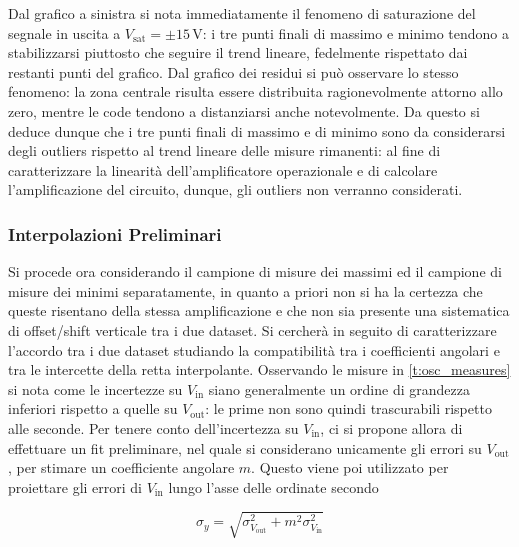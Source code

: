 \documentclass[a4paper,11pt]{article} %
\begin{document}
\noindent Dal grafico a sinistra si nota immediatamente il fenomeno di saturazione del segnale in uscita a
$V_{\text{sat}}=\pm15\,\si{\volt}$: i tre punti finali di massimo e minimo tendono a stabilizzarsi piuttosto che seguire
il trend lineare, fedelmente rispettato dai restanti punti del grafico. Dal grafico dei residui si può osservare lo
stesso fenomeno: la zona centrale risulta essere distribuita ragionevolmente attorno allo zero, mentre le code tendono a
distanziarsi anche notevolmente. Da questo si deduce dunque che i tre punti finali di massimo e di minimo sono da
considerarsi degli outliers rispetto al trend lineare delle misure rimanenti: al fine di caratterizzare la
linearità dell'amplificatore operazionale e di calcolare l'amplificazione del circuito, dunque, gli outliers non
verranno considerati.


\subsubsection{Interpolazioni Preliminari}\label{s:pre} Si procede ora considerando il campione di misure dei massimi ed
il campione di misure dei minimi separatamente, in quanto a priori non si ha la certezza che queste risentano della
stessa amplificazione e che non sia presente una sistematica di offset/shift verticale tra i due dataset. Si cercherà in
seguito di caratterizzare l'accordo tra i due dataset studiando la compatibilità tra i coefficienti angolari e tra le
intercette della retta interpolante. Osservando le misure in  \autoref{t:osc_measures} si nota come le incertezze su
$V_{\text{in}}$ siano generalmente un ordine di grandezza inferiori rispetto a quelle su $V_{\text{out}}$: le prime non
sono quindi trascurabili rispetto alle seconde. Per tenere conto dell'incertezza su $V_{\text{in}}$, ci si propone
allora di effettuare un fit preliminare, nel quale si considerano unicamente gli errori su $V_{\text{out}}$, per stimare
un coefficiente angolare $m$. Questo viene poi utilizzato per proiettare gli errori di $V_{\text{in}}$ lungo l'asse
delle ordinate secondo 

\begin{equation}\label{e:proj}
	\sigma_{y} = \sqrt{	\sigma_{V_{\text{out}}}^2	+	m^2	\sigma_{V_{\text{in}}}^2	}
\end{equation}
\end{document}
